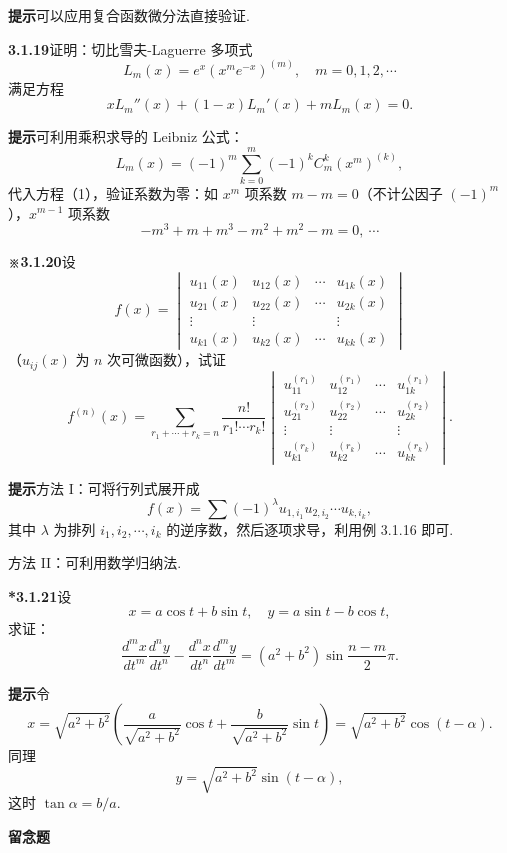 \documentclass[UTF8,12pt,a4paper,fontset=fandol]{ctexart}
\begin{document}
\noindent\textbf{提示}\quad 可以应用复合函数微分法直接验证.

\noindent\textbf{3.1.19}\quad 证明：切比雪夫-Laguerre 多项式
\[
  L_m(x)=e^x(x^me^{-x})^{(m)},\quad m=0,1,2,\cdots
\]
满足方程
\begin{equation}
  xL_m''(x)+(1-x)L_m'(x)+mL_m(x)=0.
\tag{1}
\end{equation}

\noindent\textbf{提示}\quad 可利用乘积求导的 Leibniz 公式：
\[
  L_m(x)=(-1)^m\sum_{k=0}^{m}(-1)^k C_m^k(x^m)^{(k)},
\]
代入方程（1），验证系数为零：如 $x^m$ 项系数 $m-m=0$（不计公因子 $(-1)^m$），$x^{m-1}$ 项系数
\[
  -m^3+m+m^3-m^2+m^2-m=0,\ \cdots
\]

\noindent\textbf{※3.1.20}\quad 设
\[
  f(x)=
  \begin{vmatrix}
  u_{11}(x)&u_{12}(x)&\cdots&u_{1k}(x)\\
  u_{21}(x)&u_{22}(x)&\cdots&u_{2k}(x)\\
  \vdots&\vdots&&\vdots\\
  u_{k1}(x)&u_{k2}(x)&\cdots&u_{kk}(x)
  \end{vmatrix}
\]
（$u_{ij}(x)$ 为 $n$ 次可微函数），试证
\[
  f^{(n)}(x)=\sum_{r_1+\cdots+r_k=n}\frac{n!}{r_1!\cdots r_k!}
  \begin{vmatrix}
  u_{11}^{(r_1)}&u_{12}^{(r_1)}&\cdots&u_{1k}^{(r_1)}\\
  u_{21}^{(r_2)}&u_{22}^{(r_2)}&\cdots&u_{2k}^{(r_2)}\\
  \vdots&\vdots&&\vdots\\
  u_{k1}^{(r_k)}&u_{k2}^{(r_k)}&\cdots&u_{kk}^{(r_k)}
  \end{vmatrix}.
\]

\noindent\textbf{提示}\quad 方法 I：可将行列式展开成
\[
  f(x)=\sum(-1)^\lambda u_{1,i_1}u_{2,i_2}\cdots u_{k,i_k},
\]
其中 $\lambda$ 为排列 $i_1,i_2,\cdots,i_k$ 的逆序数，然后逐项求导，利用例 3.1.16 即可.

方法 II：可利用数学归纳法.

\noindent\textbf{*3.1.21}\quad 设
\[
  x=a\cos t+b\sin t,\quad y=a\sin t-b\cos t,
\]
求证：
\[
  \frac{d^m x}{dt^m}\frac{d^n y}{dt^n}
  -\frac{d^n x}{dt^n}\frac{d^m y}{dt^m}
  =(a^2+b^2)\sin\frac{n-m}{2}\pi.
\]

\noindent\textbf{提示}\quad 令
\[
  x=\sqrt{a^2+b^2}\left(\frac{a}{\sqrt{a^2+b^2}}\cos t+
  \frac{b}{\sqrt{a^2+b^2}}\sin t\right)
  =\sqrt{a^2+b^2}\cos(t-\alpha).
\]
同理
\[
  y=\sqrt{a^2+b^2}\sin(t-\alpha),
\]
这时 $\tan\alpha=b/a$.

\noindent\textbf{留念题}\quad
\end{document}
